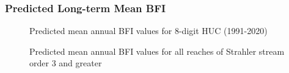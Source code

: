 \documentclass[
]{agujournal2019}
\begin{document}
\subsubsection{Predicted Long-term Mean
BFI}\label{predicted-long-term-mean-bfi}

\begin{figure}


\caption{\label{fig-bfi-huc}Predicted mean annual BFI values for 8-digit
HUC (1991-2020)}

\end{figure}%

\begin{figure}


\caption{\label{fig-bfi-streams}Predicted mean annual BFI values for all
reaches of Strahler stream order 3 and greater}

\end{figure}%
\end{document}

